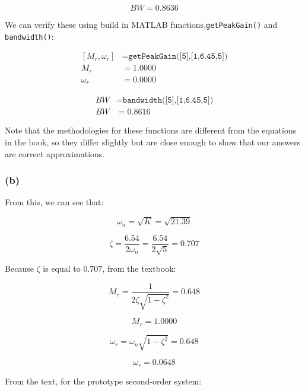 \documentclass[12pt, letterpaper]{../assignment}
\begin{document}
\begin{answer}
    $$ BW = 0.8636 $$
\end{answer}

We can verify these using build in MATLAB functions,\texttt{getPeakGain()} and\\ \texttt{bandwidth()}:

\begin{equation*}
    \begin{aligned}
        [M_r,\omega_r] &= \texttt{getPeakGain([5],[1,6.45,5])}\\
        M_r &= 1.0000\\
        \omega_r &= 0.0000
    \end{aligned}
\end{equation*}

\begin{equation*}
    \begin{aligned}
        BW &= \texttt{bandwidth([5],[1,6.45,5])}\\
        BW &= 0.8616
    \end{aligned}
\end{equation*}

Note that the methodologies for these functions are different from the equations in the book,
so they differ slightly but are close enough to show that our answers are correct approximations.

\subsubsection*{ (b)  }

From this, we can see that:

$$ \omega_n = \sqrt{K} = \sqrt{21.39} $$

$$ \zeta = \frac{6.54}{2 \omega_n} = \frac{6.54}{2 \sqrt{5}} = 0.707 $$

Because $\zeta$ is equal to $0.707$, from the textbook:

$$ M_r = \frac{1}{2 \zeta \sqrt{1- \zeta^2}} = 0.648$$

\begin{answer}
    $$ M_r = 1.0000 $$
\end{answer}

$$ \omega_r = \omega_n \sqrt{1- \zeta^2} = 0.648$$

\begin{answer}
    $$ \omega_r = 0.0648 $$
\end{answer}

From the text, for the prototype second-order system:
\end{document}
